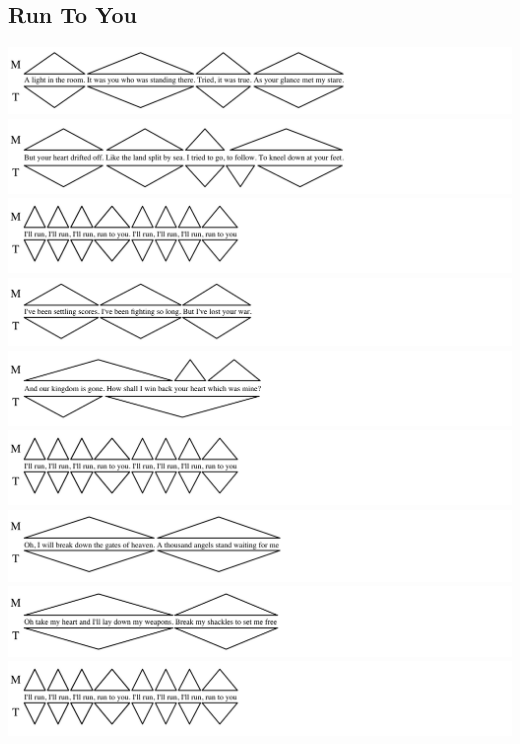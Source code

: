 \normalsize
\fi





\subsection*{Run To You}

\includegraphics[width=\textwidth]{resources/trees/rty-s1-1.png}
\includegraphics[width=\textwidth]{resources/trees/rty-s1-2.png}
\includegraphics[width=\textwidth]{resources/trees/rty-r.png}
\includegraphics[width=\textwidth]{resources/trees/rty-s2-1.png}
\includegraphics[width=\textwidth]{resources/trees/rty-s2-2.png}
\includegraphics[width=\textwidth]{resources/trees/rty-r.png}
\includegraphics[width=\textwidth]{resources/trees/rty-br-1.png}
\includegraphics[width=\textwidth]{resources/trees/rty-br-2.png}
\includegraphics[width=\textwidth]{resources/trees/rty-r.png}

